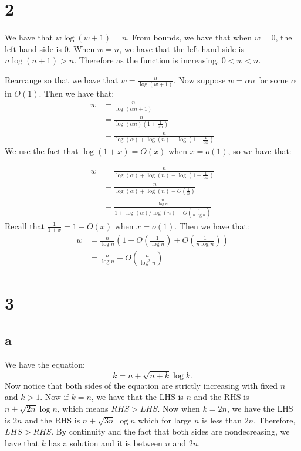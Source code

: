\documentclass[]{article}
\begin{document}
\section{2}
We have that $w \log (w + 1) = n$. 
From bounds, we have that when $w = 0$, the left hand side is $0$. When $w = n$, we have that the left hand side is $n \log(n + 1) > n$. Therefore as the function is increasing, $0 < w < n$. 

Rearrange so that we have that $w = \frac{n}{\log(w + 1)}$. Now suppose $w = \alpha n$ for some $\alpha$ in $O(1)$. Then we have that:
\begin{align*}
	w &= \frac{n}{\log(\alpha n + 1)}\\
	&= \frac{n}{\log(\alpha n) (1 + \frac{1}{\alpha n})}\\
	&=\frac{n}{\log(\alpha) + \log(n) - \log(1 + \frac{1}{\alpha n})}
\end{align*}
We use the fact that $\log(1 + x) = O(x)$ when $x = o(1)$, so we have that:

\begin{align*}
	w &=\frac{n}{\log(\alpha) + \log(n) - \log(1 + \frac{1}{\alpha n})}\\
	&= \frac{n}{
		\log(\alpha) + \log(n) - O(\frac{1}{n})
		}\\
	&= \frac{\frac{n}{\log n}}{
	1 + \log(\alpha)/\log(n) - O(\frac{1}{n \log n})
	}
\end{align*}
Recall that $\frac{1}{1 + x} = 1 + O(x)$ when $x = o(1)$. Then we have that:
\begin{align*}
	w &= \frac{n}{\log n} ( 1 + O(\frac{1}{\log n}) + O(\frac{1}{n \log n}))\\
	&= \frac{n}{\log n} + O(\frac{n}{\log^2 n})
\end{align*}

\section{3}
\subsection{a}
We have the equation:
\begin{equation}
	k = n + \sqrt{n + k} \log k.
\end{equation}
Now notice that both sides of the equation are strictly increasing with fixed $n$ and $k > 1$. Now if $k = n$, we have that the LHS is $n$ and the RHS is $n + \sqrt{2n} \log n$, which means $RHS > LHS$. Now when $k = 2n$, we have the LHS is $2n$ and the RHS is $n + \sqrt{3n} \log n$ which for large $n$ is less than $2n$. Therefore, $LHS > RHS$. By continuity and the fact that both sides are nondecreasing, we have that $k$ has a solution and it is between $n$ and $2n$. 
\end{document}
